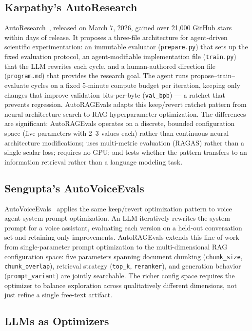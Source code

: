 \documentclass[11pt,a4paper]{article}
\begin{document}
\subsection{Karpathy's AutoResearch}

AutoResearch~\cite{karpathy2026autoresearch}, released on March 7, 2026, gained
over 21,000 GitHub stars within days of release. It proposes a three-file
architecture for agent-driven scientific experimentation: an immutable evaluator
(\texttt{prepare.py}) that sets up the fixed evaluation protocol, an
agent-modifiable implementation file (\texttt{train.py}) that the LLM rewrites
each cycle, and a human-authored direction file (\texttt{program.md}) that
provides the research goal. The agent runs propose--train--evaluate cycles on a
fixed 5-minute compute budget per iteration, keeping only changes that improve
validation bits-per-byte (\texttt{val\_bpb}) --- a ratchet that prevents
regression. AutoRAGEvals adapts this keep/revert ratchet pattern from neural
architecture search to RAG hyperparameter optimization. The differences are
significant: AutoRAGEvals operates on a discrete, bounded configuration space
(five parameters with 2--3 values each) rather than continuous neural
architecture modifications; uses multi-metric evaluation (RAGAS) rather than a
single scalar loss; requires no GPU; and tests whether the pattern transfers to
an information retrieval rather than a language modeling task.

\subsection{Sengupta's AutoVoiceEvals}

AutoVoiceEvals~\cite{sengupta2025autovoiceevals} applies the same keep/revert
optimization pattern to voice agent system prompt optimization. An LLM
iteratively rewrites the system prompt for a voice assistant, evaluating each
version on a held-out conversation set and retaining only improvements.
AutoRAGEvals extends this line of work from single-parameter prompt optimization
to the multi-dimensional RAG configuration space: five parameters spanning
document chunking (\texttt{chunk\_size}, \texttt{chunk\_overlap}), retrieval
strategy (\texttt{top\_k}, \texttt{reranker}), and generation behavior
(\texttt{prompt\_variant}) are jointly searchable. The richer config space
requires the optimizer to balance exploration across qualitatively different
dimensions, not just refine a single free-text artifact.

\subsection{LLMs as Optimizers}
\end{document}
